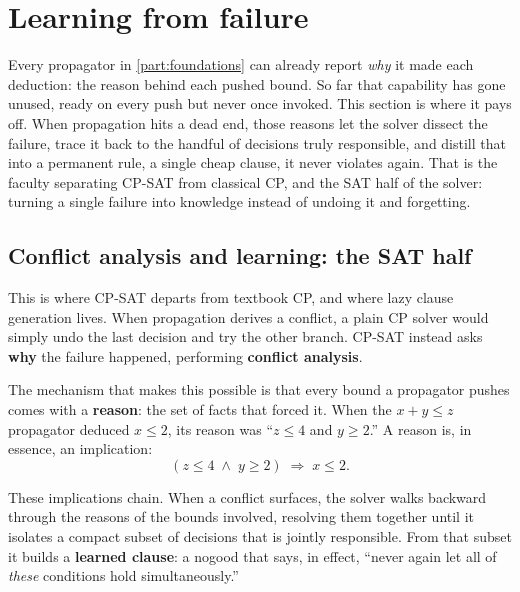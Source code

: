 \section{Learning from failure}\label{part:learning}

Every propagator in \cref{part:foundations} can already report \emph{why} it made
each deduction: the reason behind each pushed bound. So far that capability has
gone unused, ready on every push but never once invoked. This section is
where it pays off. When propagation hits a dead end, those reasons let the solver
dissect the failure, trace it back to the handful of decisions truly responsible,
and distill that into a permanent rule, a single cheap clause, it never violates
again. That is the
faculty separating CP-SAT from classical CP, and the SAT half of the solver:
turning a single failure into knowledge instead of undoing it and forgetting.

\subsection{Conflict analysis and learning: the SAT half}\label{sec:learning}

This is where CP-SAT departs from textbook CP, and where lazy clause generation
lives. When propagation derives a conflict, a plain CP solver would simply undo
the last decision and try the other branch. CP-SAT instead asks \textbf{why} the
failure happened, performing \textbf{conflict analysis}.

The mechanism that makes this possible is that every bound a propagator pushes
comes with a \textbf{reason}: the set of facts that forced it. When the
$x + y \le z$ propagator deduced $x \le 2$, its reason was ``$z \le 4$
and $y \ge 2$.'' A reason is, in essence, an implication:
\[
  (z \le 4 \;\wedge\; y \ge 2) \;\Rightarrow\; x \le 2 .
\]

These implications chain. When a conflict surfaces, the solver walks backward
through the reasons of the bounds involved, resolving them together until it
isolates a compact subset of decisions that is jointly responsible. From that
subset it builds a \textbf{learned clause}: a nogood that says, in effect,
``never again let all of \emph{these} conditions hold simultaneously.''


